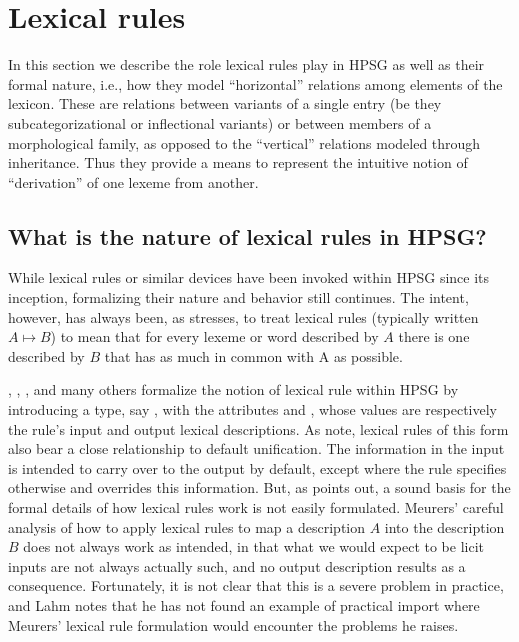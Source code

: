 \documentclass[output=paper
 	        ,biblatex
                ,babelshorthands
                ,newtxmath
                ,draftmode
                ,colorlinks, citecolor=brown
]{langscibook}
\begin{document}
\section{Lexical rules}
\label{lexicon-sec-lexical-rules}


In this section we describe the role lexical rules play in HPSG as well as their formal nature, i.e., how they model ``horizontal'' relations among elements of the lexicon. These are relations between variants of a single entry (be they subcategorizational or inflectional variants) or between members of a morphological family, as opposed to the ``vertical'' relations modeled through inheritance. Thus they provide a means to represent the intuitive notion of ``derivation'' of one lexeme from another. 

\subsection{What is the nature of lexical rules in HPSG?}

While lexical rules or similar devices have been invoked within HPSG since its inception, formalizing their nature and behavior still  continues.
The intent, however, has always been, as \citet{Lahm2016} stresses, to treat lexical rules (typically written $A \mapsto B$) to mean that for every lexeme or word described by $A$ there is one described by $B$ that has as much in common with A as possible.

\citet{CopestakeandBriscoe1991}, \citet{BriscoeandCopestake1999}, \citet{Meurers2001}, and many others formalize the notion of lexical rule within HPSG by introducing a type, say , with the attributes  and , whose values are respectively the rule's input and output lexical descriptions. As \citet{BriscoeandCopestake1999} note, lexical rules of this form also bear a close relationship to default unification.
The information in the input is intended to carry over to the output by default, except where the rule specifies otherwise and overrides this information. But, as \citet{Lahm2016} points out, a sound basis for the formal details of how lexical rules work is not easily formulated. Meurers' careful analysis of how to apply lexical rules to map a description $A$ into the description $B$ does not always work as intended, in that what we would expect to be licit inputs are not always actually such, and no output description results as a consequence. Fortunately,  it is not clear that this is a severe problem in practice, and Lahm notes that he has not found an example of practical import where Meurers' lexical rule formulation would encounter the problems he raises.
\end{document}

